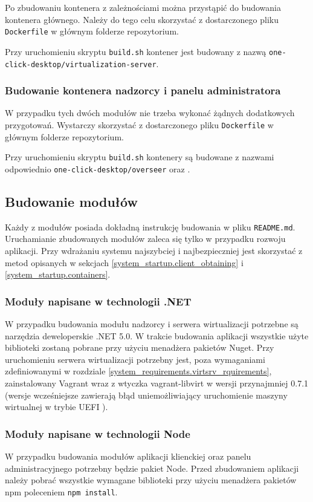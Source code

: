 \documentclass[../opis-rozwiazania.tex]{subfiles}
\begin{document}
Po zbudowaniu kontenera z zależnościami można przystąpić do budowania kontenera głównego.
Należy do tego celu skorzystać z dostarczonego pliku \texttt{Dockerfile} w głównym folderze repozytorium.

Przy uruchomieniu skryptu \texttt{build.sh} kontener jest budowany z nazwą \texttt{one-click-desktop/virtualization-server}.

\subsubsection{Budowanie kontenera nadzorcy i panelu administratora}
W przypadku tych dwóch modułów nie trzeba wykonać żądnych dodatkowych przygotowań.
Wystarczy skorzystać z dostarczonego pliku \texttt{Dockerfile} w głównym folderze repozytorium.

Przy uruchomieniu skryptu \texttt{build.sh} kontenery są budowane z nazwami odpowiednio \texttt{one-click-desktop/overseer} oraz \texttt{}.

\subsection{Budowanie modułów}
Każdy z modułów posiada dokładną instrukcję budowania w pliku \texttt{README.md}.
Uruchamianie zbudowanych modułów zaleca się tylko w przypadku rozwoju aplikacji.
Przy wdrażaniu systemu najszybciej i najbezpieczniej jest skorzystać z metod opisanych w sekcjach \ref{system_startup.client_obtaining} i \ref{system_startup.containers}.

\subsubsection{Moduły napisane w technologii .NET}
W przypadku budowania modułu nadzorcy i serwera wirtualizacji potrzebne są narzędzia deweloperskie .NET 5.0.
W trakcie budowania aplikacji wszystkie użyte biblioteki zostaną pobrane przy użyciu menadżera pakietów Nuget.
Przy uruchomieniu serwera wirtualizacji potrzebny jest, poza wymaganiami zdefiniowanymi w rozdziale \ref{system_requirements.virtsrv_rquirements}, zainstalowany Vagrant wraz z wtyczka vagrant-libvirt w wersji przynajmniej 0.7.1 (wersje wcześniejsze zawierają błąd uniemożliwiający uruchomienie maszyny wirtualnej w trybie UEFI \parencite{vagrant-libvirt-nvram-error}).

\subsubsection{Moduły napisane w technologii Node}
W przypadku budowania modułów aplikacji klienckiej oraz panelu administracyjnego potrzebny będzie pakiet Node. Przed zbudowaniem aplikacji należy pobrać wszystkie wymagane biblioteki przy użyciu menadżera pakietów npm poleceniem \texttt{npm install}.
\end{document}
